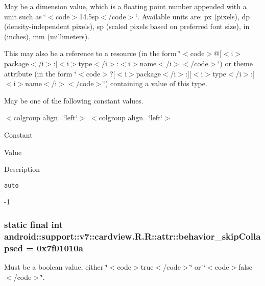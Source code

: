May be a dimension value, which is a floating point number appended with a unit such as \char`\"{}$<$code$>$14.5sp$<$/code$>$\char`\"{}. Available units are: px (pixels), dp (density-independent pixels), sp (scaled pixels based on preferred font size), in (inches), mm (millimeters). 

This may also be a reference to a resource (in the form \char`\"{}$<$code$>$@\mbox{[}$<$i$>$package$<$/i$>$:\mbox{]}$<$i$>$type$<$/i$>$:$<$i$>$name$<$/i$>$$<$/code$>$\char`\"{}) or theme attribute (in the form \char`\"{}$<$code$>$?\mbox{[}$<$i$>$package$<$/i$>$:\mbox{]}\mbox{[}$<$i$>$type$<$/i$>$:\mbox{]}$<$i$>$name$<$/i$>$$<$/code$>$\char`\"{}) containing a value of this type. 

May be one of the following constant values. \begin{TabularC}{0}
\hline
\end{TabularC}
$<$colgroup align=\char`\"{}left\char`\"{}$>$ $<$colgroup align=\char`\"{}left\char`\"{}$>$ 

Constant

Value

Description 

{\tt auto}

-1\hypertarget{classandroid_1_1support_1_1v7_1_1cardview_1_1_r_1_1attr_33f451d5d9b62b7e6f265dc476c9b191}{
\subsubsection[{behavior\_\-skipCollapsed}]{\setlength{\rightskip}{0pt plus 5cm}static final int android::support::v7::cardview.R.R::attr::behavior\_\-skipCollapsed = 0x7f01010a}}
\label{classandroid_1_1support_1_1v7_1_1cardview_1_1_r_1_1attr_33f451d5d9b62b7e6f265dc476c9b191}


Must be a boolean value, either \char`\"{}$<$code$>$true$<$/code$>$\char`\"{} or \char`\"{}$<$code$>$false$<$/code$>$\char`\"{}. 

